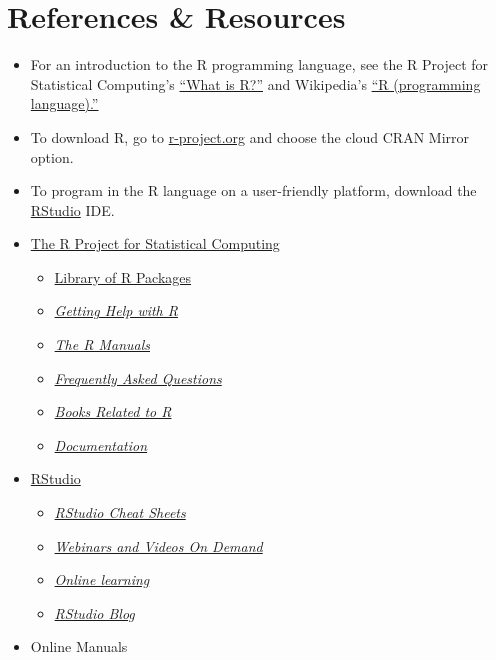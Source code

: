 \documentclass[
]{book}
\providecommand{\tightlist}{%
  \setlength{\itemsep}{0pt}\setlength{\parskip}{0pt}}
\begin{document}
\hypertarget{references-resources}{%
\chapter{References \& Resources}\label{references-resources}}

\begin{itemize}
\item
  For an introduction to the R programming language, see the R Project for Statistical Computing's \href{https://www.r-project.org/about.html}{``What is R?''} and Wikipedia's \href{https://en.wikipedia.org/wiki/R_(programming_language)}{``R (programming language).''}
\item
  To download R, go to \href{https://www.r-project.org/}{r-project.org} and choose the cloud CRAN Mirror option.
\item
  To program in the R language on a user-friendly platform, download the \href{https://www.rstudio.com/}{RStudio} IDE.
\item
  \href{https://www.r-project.org/}{The R Project for Statistical Computing}

  \begin{itemize}
  \tightlist
  \item
    \href{https://cran.r-project.org/web/packages/}{Library of R Packages}
  \item
    \href{https://www.r-project.org/help.html}{\emph{Getting Help with R}}
  \item
    \href{https://cran.r-project.org/manuals.html}{\emph{The R Manuals}}
  \item
    \href{https://cran.r-project.org/faqs.html}{\emph{Frequently Asked Questions}}
  \item
    \href{https://www.r-project.org/doc/bib/R-books.html}{\emph{Books Related to R}}
  \item
    \href{https://www.r-project.org/other-docs.html}{\emph{Documentation}}
  \end{itemize}
\item
  \href{https://www.rstudio.com/}{RStudio}

  \begin{itemize}
  \tightlist
  \item
    \href{https://www.rstudio.com/resources/cheatsheets/}{\emph{RStudio Cheat Sheets}}
  \item
    \href{https://www.rstudio.com/resources/webinars/}{\emph{Webinars and Videos On Demand}}
  \item
    \href{https://www.rstudio.com/online-learning/}{\emph{Online learning}}
  \item
    \href{https://blog.rstudio.com/}{\emph{RStudio Blog}}
  \end{itemize}
\item
  Online Manuals


\end{itemize}
\end{document}
